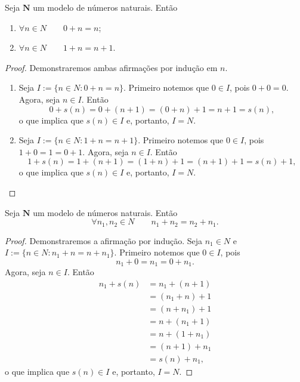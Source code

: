 \begin{lema} \label{conj.nat.lem.adi}
	Seja $\bm N$ um modelo de números naturais. Então
	\begin{enumerate}
	\item $\forall n \in N \qquad 0+n=n$;
	\item $\forall n \in N \qquad 1+n=n+1$.
	\end{enumerate}
\end{lema}
\begin{proof}
	Demonstraremos ambas afirmações por indução em $n$.
	\begin{enumerate}
	\item Seja $I := \{n \in N:0+n=n\}$. Primeiro notemos que $0 \in I$, pois $0+0=0$. Agora, seja $n \in I$. Então
	\begin{equation*}
	0+s(n)=0+(n+1)=(0+n)+1=n+1=s(n),
	\end{equation*}
o que implica que $s(n) \in I$ e, portanto, $I=N$.

	\item Seja $I := \{n \in N:1+n=n+1\}$. Primeiro notemos que $0 \in I$, pois $1+0=1=0+1$. Agora, seja $n \in I$. Então
	\begin{equation*}
	1+s(n)=1+(n+1)=(1+n)+1=(n+1)+1=s(n)+1,
	\end{equation*}
o que implica que $s(n) \in I$ e, portanto, $I=N$.
	\end{enumerate}
\end{proof}

\begin{teo}
	Seja $\bm N$ um modelo de números naturais. Então
	\begin{equation*}
	\forall n_1,n_2 \in N \qquad n_1+n_2 = n_2+n_1.
	\end{equation*}
\end{teo}
\begin{proof}
 	Demonstraremos a afirmação por indução. Seja $n_1 \in N$ e $I := \{n \in N:n_1+n=n+n_1\}$. Primeiro notemos que $0 \in I$, pois
 	\begin{equation*}
 	n_1+0=n_1=0+n_1.
 	\end{equation*}
Agora, seja $n \in I$. Então
 	\begin{align*}
 	n_1+s(n) &= n_1+(n+1) \\
 		&= (n_1+n)+1 \\
 		&= (n+n_1)+1 \\
 		&= n+(n_1+1) \\
 		&= n+(1+n_1) \\
 		&= (n+1)+n_1 \\
 		&= s(n)+n_1,
 	\end{align*}
 o que implica que $s(n) \in I$ e, portanto, $I=N$.
\end{proof}

